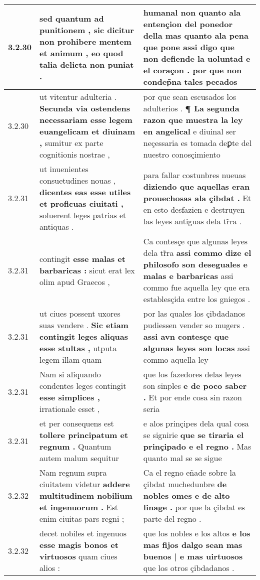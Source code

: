 \begin{tabular}{|p{1cm}|p{6.5cm}|p{6.5cm}|}
3.2.30 & sed quantum ad punitionem , \textbf{ sic dicitur non prohibere mentem et animum , } eo quod talia delicta non puniat . & humanal non quanto ala entençion del ponedor della \textbf{ mas quanto ala pena que pone assi digo que non defiende la uoluntad e el coraçon . } por que non condep̃na tales pecados \\\hline
3.2.30 & ut vitentur adulteria . \textbf{ Secunda via ostendens necessariam esse legem euangelicam et diuinam , } sumitur ex parte cognitionis nostrae , & por que sean escusados los adulterios . \textbf{ ¶ La segunda razon que muestra la ley en angelical } e diuinal ser neçessaria es tomada deꝑte del nuestro conosçimiento \\\hline
3.2.31 & ut inuenientes consuetudines nouas , \textbf{ dicentes eas esse utiles et proficuas ciuitati , } soluerent leges patrias et antiquas . & para fallar costunbres nueuas \textbf{ diziendo que aquellas eran prouechosas ala çibdat . } Et en esto desfazien e destruyen las leyes antiguas dela tr̃ra . \\\hline
3.2.31 & contingit \textbf{ esse malas et barbaricas : } sicut erat lex olim apud Graecos , & Ca contesçe que algunas leyes dela tr̃ra \textbf{ assi commo dize el philosofo son deseguales e malas e barbaricas } assi commo fue aquella ley que era establesçida entre los gniegos . \\\hline
3.2.31 & ut ciues possent uxores suas vendere . \textbf{ Sic etiam contingit leges aliquas esse stultas , } utputa legem illam quam & por las quales los çibdadanos pudiessen vender so mugers . \textbf{ assi avn contesçe que algunas leyes son locas } assi commo aquella ley \\\hline
3.2.31 & Nam si aliquando condentes leges contingit \textbf{ esse simplices , } irrationale esset , & que los fazedores delas leyes son sinples \textbf{ e de poco saber . } Et por ende cosa sin razon seria \\\hline
3.2.31 & et per consequens est \textbf{ tollere principatum et regnum . } Quantum autem malum sequitur & e alos prinçipes dela qual cosa se signirie \textbf{ que se tiraria el prinçipado e el regno . } Mas quanto mal se se sigue \\\hline
3.2.32 & Nam regnum supra ciuitatem videtur \textbf{ addere multitudinem nobilium et ingenuorum . } Est enim ciuitas pars regni ; & Ca el regno eñade sobre la çibdat muchedunbre \textbf{ de nobles omes e de alto linage . } por que la çibdat es parte del regno . \\\hline
3.2.32 & decet nobiles et ingenuos \textbf{ esse magis bonos et virtuosos } quam ciues alios : & que los nobles e los altos \textbf{ e los mas fijos dalgo sean mas buenos | e mas uirtuosos } que los otros çibdadanos . \\\hline

\end{tabular}

